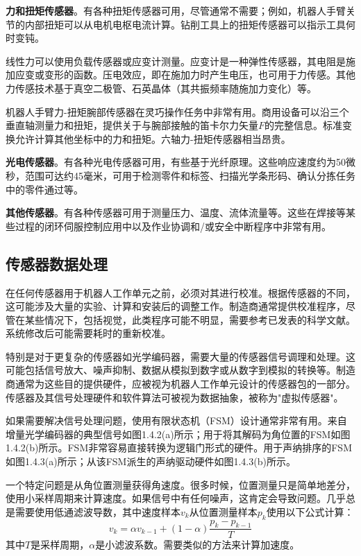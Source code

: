 \documentclass[UTF8,a4paper]{ctexart}
\begin{document}
\textbf{力和扭矩传感器}。有各种扭矩传感器可用，尽管通常不需要；例如，机器人手臂关节的内部扭矩可以从电机电枢电流计算。钻削工具上的扭矩传感器可以指示工具何时变钝。

线性力可以使用负载传感器或应变计测量。应变计是一种弹性传感器，其电阻是施加应变或变形的函数。压电效应，即在施加力时产生电压，也可用于力传感。其他力传感技术基于真空二极管、石英晶体（其共振频率随施加力变化）等。

机器人手臂力-扭矩腕部传感器在灵巧操作任务中非常有用。商用设备可以沿三个垂直轴测量力和扭矩，提供关于与腕部接触的笛卡尔力矢量$F$的完整信息。标准变换允许计算其他坐标中的力和扭矩。六轴力-扭矩传感器相当昂贵。

\textbf{光电传感器}。有各种光电传感器可用，有些基于光纤原理。这些响应速度约为50微秒，范围可达约45毫米，可用于检测零件和标签、扫描光学条形码、确认分拣任务中的零件通过等。

\textbf{其他传感器}。有各种传感器可用于测量压力、温度、流体流量等。这些在焊接等某些过程的闭环伺服控制应用中以及作业协调和/或安全中断程序中非常有用。

\subsection{传感器数据处理}

在任何传感器用于机器人工作单元之前，必须对其进行校准。根据传感器的不同，这可能涉及大量的实验、计算和安装后的调整工作。制造商通常提供校准程序，尽管在某些情况下，包括视觉，此类程序可能不明显，需要参考已发表的科学文献。系统修改后可能需要耗时的重新校准。

特别是对于更复杂的传感器如光学编码器，需要大量的传感器信号调理和处理。这可能包括信号放大、噪声抑制、数据从模拟到数字或从数字到模拟的转换等。制造商通常为这些目的提供硬件，应被视为机器人工作单元设计的传感器包的一部分。传感器及其信号处理硬件和软件算法可被视为数据抽象，被称为"虚拟传感器"。

如果需要解决信号处理问题，使用有限状态机（FSM）设计通常非常有用。来自增量光学编码器的典型信号如图1.4.2(a)所示；用于将其解码为角位置的FSM如图1.4.2(b)所示。FSM非常容易直接转换为逻辑门形式的硬件。用于声纳排序的FSM如图1.4.3(a)所示；从该FSM派生的声纳驱动硬件如图1.4.3(b)所示。

一个特定问题是从角位置测量获得角速度。很多时候，位置测量只是简单地差分，使用小采样周期来计算速度。如果信号中有任何噪声，这肯定会导致问题。几乎总是需要使用低通滤波导数，其中速度样本$v_k$从位置测量样本$p_k$使用以下公式计算：
\[
v_k = \alpha v_{k-1} + (1-\alpha) \frac{p_k - p_{k-1}}{T}
\]
其中$T$是采样周期，$\alpha$是小滤波系数。需要类似的方法来计算加速度。
\end{document}
